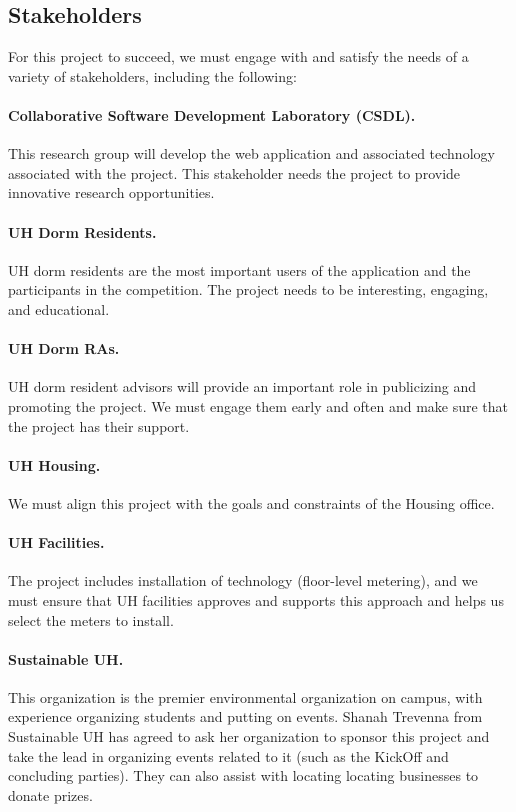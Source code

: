 \documentclass[11pt]{article}
\begin{document}
\subsection{Stakeholders}

For this project to succeed, we must engage with and satisfy the needs of a variety of stakeholders, including the following:

\paragraph{Collaborative Software Development Laboratory (CSDL).}   This research group will develop the web application and
associated technology associated with the project.  This stakeholder needs the project to provide innovative research opportunities. 

\paragraph{UH Dorm Residents.}  UH dorm residents are the most important
users of the application and the participants in the competition.  The
project needs to be interesting, engaging, and educational.

\paragraph{UH Dorm RAs.}  UH dorm resident advisors will provide an
important role in publicizing and promoting the project. We must engage
them early and often and make sure that the project  has their support. 

\paragraph{UH Housing.}  We must align this project with the goals and constraints of the Housing office. 

\paragraph{UH Facilities.}  The project includes installation of technology
(floor-level metering), and we must ensure that UH facilities approves and
supports this approach and helps us select the meters to install.

\paragraph{Sustainable UH.}  This organization is the premier environmental
organization on campus, with experience organizing students and putting on
events.  Shanah Trevenna from Sustainable UH has agreed to ask her
organization to sponsor this project and take the lead in organizing events
related to it (such as the KickOff and concluding parties).  They can also
assist with locating locating businesses to donate prizes.
\end{document}
